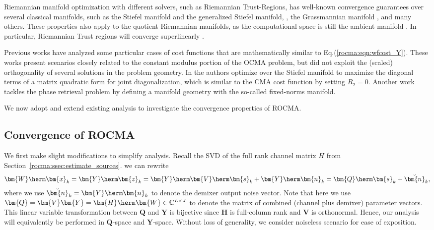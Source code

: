 Riemannian manifold optimization with different solvers, such as Riemannian Trust-Regions, has well-known convergence guarantees \cite{Absil2007trustregions} over several classical manifolds, such as the Stiefel manifold and the generalized Stiefel manifold, \cite{Edelman1999stiefel}, the Grassmannian manifold \cite{Absil2008book}, and many others. 
These properties also apply to the quotient Riemannian manifolds, as the computational space is still the ambient manifold \cite{Absil2008book}. In particular, Riemannian Trust regions will converge superlinearly \cite{Absil2007trustregions}.

Previous works have analyzed some particular cases of cost functions that are mathematically similar to Eq.(\ref{rocma:eqn:wfcost_Y}). 
These works present scenarios closely related to the constant modulus portion of the OCMA problem, but did not exploit the (scaled) orthogonality of several solutions in the problem geometry. 
In \cite{Theis2009jointdiagonalizationICA} the authors optimize over the Stiefel manifold to maximize the diagonal terms of a matrix quadratic form for joint diagonalization, which is similar to the CMA cost function by setting $R_2=0$. 
Another work \cite{Bendory2018riemannianphaseretrieval} tackles the phase retrieval problem by defining a manifold geometry with the so-called fixed-norms manifold. 

We now adopt and extend existing analysis to investigate the convergence properties
of ROCMA. 

\subsection{Convergence of ROCMA}
We first make slight modifications to simplify analysis. Recall the SVD of the full rank channel matrix $H$ from Section~\ref{rocma:ssec:estimate_sources}. we can rewrite 
\begin{align}
\bm{W}\herm\bm{x}_k=\bm{Y}\herm\bm{z}_k=\bm{Y}\herm\bm{V}\herm\bm{s}_k+\bm{Y}\herm\bm{n}_k=\bm{Q}\herm\bm{s}_k+\breve{\bm{n}}_k,\nonumber 
\end{align}
where we use $\breve{\bm{n}}_k= \bm{Y}\herm\bm{n}_k$ to denote the
demixer output noise vector. 
Note that here we use
$\bm{Q}=\bm{V}\bm{Y}=\bm{H}\herm\bm{W}\in\mathbb{C}^{L\times J}$ to
denote the matrix of combined (channel plus demixer) parameter vectors. 
This linear variable transformation between $\bm{Q}$ and $\bm{Y}$ is bijective
since $\bm{H}$ is full-column rank and $\bm{V}$ is orthonormal.
Hence, our analysis will equivalently be performed in $\bm{Q}$-space and 
$\bm{Y}$-space. Without loss of generality, we consider
noiseless scenario for ease of exposition.

